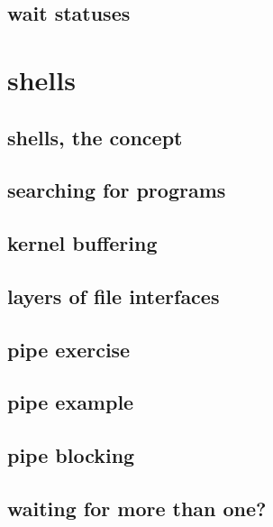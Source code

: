 

\subsection{wait statuses}


\section{shells}

\subsection{shells, the concept}



\subsection{searching for programs}


\subsection{kernel buffering}



\subsection{layers of file interfaces}



\subsection{pipe exercise}


\subsection{pipe example}

\subsection{pipe blocking}

\subsection{waiting for more than one?}

